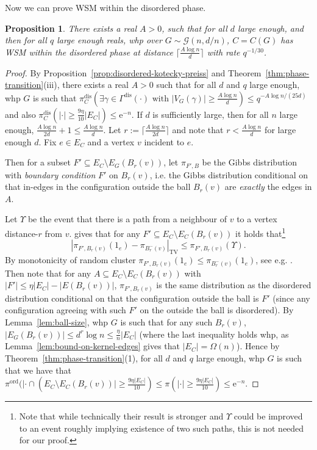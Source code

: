 \documentclass[11pt]{article}
\theoremstyle{plain}
\newtheorem{proposition}[theorem]{Proposition}
\newcommand{\G}{\mathcal{G}}
\newcommand{\emm}{\mathrm{e}}
\newcommand{\TV}{\mathrm{TV}}
\newcommand{\1}{\mathbb{1}}
\newcommand{\ord}{\mathrm{ord}}
\newcommand{\dis}{\mathrm{dis}}
\begin{document}
Now we can prove WSM within the disordered phase.

\begin{proposition}\label{prop:wsm-disorder}
    There exists a real \(A > 0\), such that for all \(d\) large enough, and then for all \(q\) large enough reals, whp over \(G\sim\G(n,d/n)\), \(C=C(G)\) has WSM within the disordered phase at distance \(\lceil \frac{A\log n}{d}\rceil\) with rate \(q^{-1/30}\).
\end{proposition}
\begin{proof}
    By Proposition~\ref{prop:disordered-kotecky-preiss} and Theorem~\ref{thm:phase-transition}(iii), there exists a real \(A > 0\) such that for all \(d\) and \(q\) large enough, whp \(G\) is such that \(\pi^\dis_C(\exists\gamma\in\Gamma^\dis(\cdot)\text{ with }|V_G(\gamma)|\geq\tfrac{A\log n}{d}) \leq  q^{-A\log n/(25d)} \) and also \(\pi^\dis_C(|\cdot|\geq\tfrac{9\eta}{10}|E_C|)\leq \emm^{-n}\). If \(d\) is sufficiently large, then for all \(n\) large enough, \(\frac{A\log n}{2d}+1\leq \frac{A\log n}{d}\).
    Let \(r := \lceil \tfrac{A\log n}{2d}\rceil\) and note that $r<\frac{A\log n}{d}$ for large enough $d$. Fix \(e\in E_C\) and a vertex \(v\) incident to \(e\).

    Then for a subset \(F'\subseteq E_C\setminus E_G(B_r(v))\), let \(\pi_{F',B}\) be the Gibbs distribution with \textit{boundary condition} \(F'\) on \(B_r(v)\), i.e. the Gibbs distribution conditional on that in-edges in the configuration outside the ball \(B_r(v)\) are \textit{exactly} the edges in \(A\).

    Let \(\Upsilon\) be the event that there is a path from a neighbour of \(v\) to a vertex distance-\(r\) from \(v\).  \cite[Lemma 5.3]{blanca2021random} gives that for any \(F'\subseteq E_C\setminus E_C(B_r(v))\)  it holds that\footnote{Note that while technically their result is stronger and \(\Upsilon\) could be improved to an event roughly implying existence of two such paths, this is not needed for our proof.}
    \[
    |\pi_{F',B_r(v)}(1_e) - \pi_{B_r^-(v)}|_\TV\leq \pi_{F',B_r(v)}(\Upsilon).
    \]
        By monotonicity of random cluster \(\pi_{F',B_r(v)}(1_e) \leq \pi_{B_r^{-}(v)}(1_e)\), see e.g. \cite[Corollary~53]{Galanis_Goldberg_Smolarova_2024}. Then note that for any \(A\subseteq E_C\setminus E_C(B_r(v))\) with \(|F'|\leq \eta |E_C| - |E(B_r(v))|\), \(\pi_{F',B_r(v)}\) is the same distribution as the disordered distribution conditional on that the configuration outside the ball is \(F'\) (since any configuration agreeing with such \(F'\) on the outside the ball is disordered).
    By Lemma~\ref{lem:ball-size}, whp \(G\) is such that for any such \(B_r(v)\), \(|E_G(B_r(v))|\leq d^r \log n \leq \tfrac{\eta}{n}|E_C|\) (where the last inequality holds whp, as Lemma~\ref{lem:bound-on-kernel-edges} gives that \(|E_C|=\Omega(n)\)). Hence by Theorem~\ref{thm:phase-transition}(1), for all \(d\) and \(q\) large enough, whp \(G\) is such that we have that \(\pi^\ord(|\cdot\cap (E_C\setminus E_C(B_r(v))|\geq \tfrac{9\eta|E_C| }{10}) \leq \pi(|\cdot|\geq \tfrac{9\eta|E_C|}{10})\leq \emm^{-n}\).
    

\end{proof}
\end{document}
